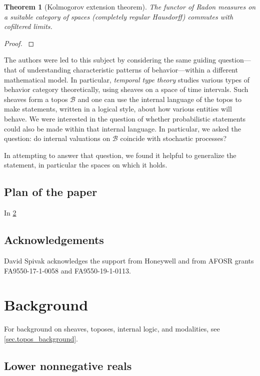 \documentclass[11pt, oneside, article]{memoir}
\theoremstyle{plain}
\newtheorem{theorem}{Theorem}[chapter] %
\theoremstyle{definition}
\theoremstyle{remark}
\newcommand{\cat}[1]{\mathcal{#1}}
\begin{document}
\begin{theorem}[Kolmogorov extension theorem]
The functor of Radon measures on a suitable category of spaces (completely regular Hausdorff) commutes with cofiltered limits.
\end{theorem}
\begin{proof}
\cite[Theorem 2.5]{danos2015dirichlet}
\end{proof}



The authors were led to this subject by considering the same guiding question---that of understanding characteristic patterns of behavior---within a different mathematical model. In particular, \emph{temporal type theory} \cite{schultz2019temporal} studies various types of behavior category theoretically, using sheaves on a space of time intervals. Such sheaves form a topos $\cat{B}$ and one can use the internal language of the topos to make statements, written in a logical style, about how various entities will behave. We were interested in the question of whether probabilistic statements could also be made within that internal language. In particular, we asked the question: do internal valuations on $\cat{B}$ coincide with stochastic processes?

In attempting to answer that question, we found it helpful to generalize the statement, in particular the spaces on which it holds. 

\section{Plan of the paper}
In \cref{chap.background}


\section*{Acknowledgements}
David Spivak acknowledges the support from Honeywell and from AFOSR grants FA9550-17-1-0058 and FA9550-19-1-0113.



\chapter{Background}\label{chap.background}

For background on sheaves, toposes, internal logic, and modalities, see \cref{sec.topos_background}.

\section{Lower nonnegative reals}
\end{document}
